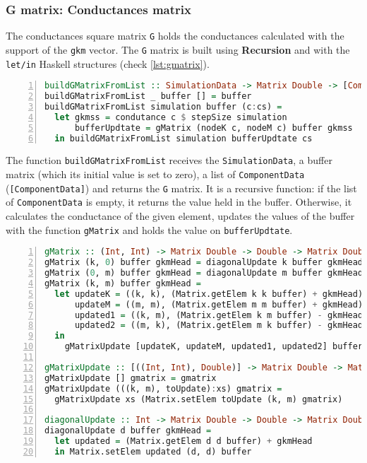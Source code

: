 \subsubsection {G matrix: Conductances matrix}

The conductances square matrix \lstinline!G! holds the conductances calculated with the support of the \lstinline!gkm! vector. The \lstinline!G! matrix is built using \textbf{Recursion} and with the \lstinline!let/in! Haskell structures (check \cref{lst:gmatrix}).

\begin{lstlisting}[language=Haskell, numbers=left, caption={Building the G Matrix}, captionpos=b, label={lst:gmatrix}]
buildGMatrixFromList :: SimulationData -> Matrix Double -> [ComponentData] ->  Matrix Double
buildGMatrixFromList _ buffer [] = buffer
buildGMatrixFromList simulation buffer (c:cs) =
  let gkmss = condutance c $ stepSize simulation 
      bufferUpdtate = gMatrix (nodeK c, nodeM c) buffer gkmss 
  in buildGMatrixFromList simulation bufferUpdtate cs
\end{lstlisting}

The function \lstinline!buildGMatrixFromList! receives the \lstinline!SimulationData!, a buffer matrix (which its initial value is set to zero), a list of \lstinline!ComponentData! (\lstinline![ComponentData]!) and returns the \lstinline!G! matrix. It is a recursive function: if the list of \lstinline!ComponentData! is empty, it returns the value held in the buffer. Otherwise, it calculates the conductance of the given element, updates the values of the buffer with the function \lstinline!gMatrix! and holds the value on \lstinline!bufferUpdtate!.


\begin{lstlisting}[language=Haskell, numbers=left, caption={Building the G Matrix buffer update}, captionpos=b, label={lst:gmatrixaux}]
gMatrix :: (Int, Int) -> Matrix Double -> Double -> Matrix Double
gMatrix (k, 0) buffer gkmHead = diagonalUpdate k buffer gkmHead
gMatrix (0, m) buffer gkmHead = diagonalUpdate m buffer gkmHead
gMatrix (k, m) buffer gkmHead = 
  let updateK = ((k, k), (Matrix.getElem k k buffer) + gkmHead)
      updateM = ((m, m), (Matrix.getElem m m buffer) + gkmHead)
      updated1 = ((k, m), (Matrix.getElem k m buffer) - gkmHead)
      updated2 = ((m, k), (Matrix.getElem m k buffer) - gkmHead)
  in
    gMatrixUpdate [updateK, updateM, updated1, updated2] buffer

gMatrixUpdate :: [((Int, Int), Double)] -> Matrix Double -> Matrix Double
gMatrixUpdate [] gmatrix = gmatrix
gMatrixUpdate (((k, m), toUpdate):xs) gmatrix =
  gMatrixUpdate xs (Matrix.setElem toUpdate (k, m) gmatrix)

diagonalUpdate :: Int -> Matrix Double -> Double -> Matrix Double
diagonalUpdate d buffer gkmHead =
  let updated = (Matrix.getElem d d buffer) + gkmHead
  in Matrix.setElem updated (d, d) buffer
\end{lstlisting}

